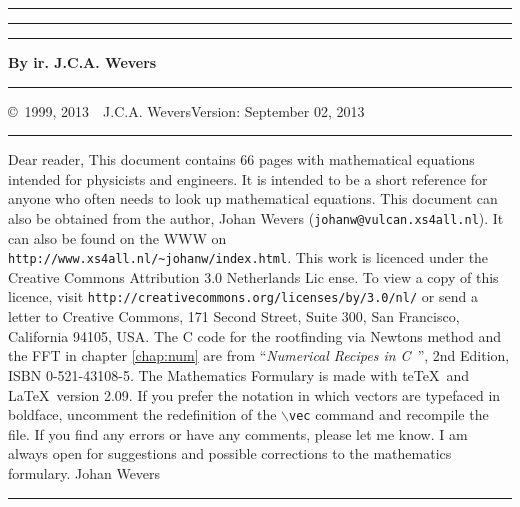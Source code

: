 \pagestyle{fancyplain}
\cfoot{\fancyplain{\thepage}{}}

\thispagestyle{empty}
\hrule
\rule{.4pt}{22.35cm}\hspace*{161.62mm}\rule{.4pt}{22.35cm}
\vspace*{-17cm}
\begin{center}
\Huge
{}
\end{center}
\vspace{2cm}
\centerline{\Large\bf By ir. J.C.A. Wevers}
\vfill
\hrule
\newpage
\thispagestyle{empty}
\copyright~1999, 2013~~J.C.A. Wevers\hfill Version: September 02, 2013
\npar
\hrule
\par
\bigskip
Dear reader,
\npar
This document contains 66 pages with mathematical equations intended for
physicists and engineers. It is intended to be a short reference for anyone
who often needs to look up mathematical equations.
\npar
This document can also be obtained from the author, Johan Wevers ({\tt johanw@vulcan.xs4all.nl}).
\npar
It can also be found on the WWW on {\tt http://www.xs4all.nl/\~{}johanw/index.html}.
\npar
This work is licenced under the Creative Commons Attribution 3.0 Netherlands Lic
ense.
To view a copy of this licence, visit {\tt http://creativecommons.org/licenses/by/3.0/nl/} or send a letter to Creative Commons, 171 Second Street, Suite 300, San Francisco, California 94105, USA.
\npar
The C code for the rootfinding via Newtons method and the FFT in chapter
\ref{chap:num} are from ``{\it Numerical Recipes in C}~'', 2nd Edition,
ISBN 0-521-43108-5.
\npar
The Mathematics Formulary is made with te\TeX\ and \LaTeX\ version 2.09.
\npar
If you prefer the notation in which vectors are typefaced in boldface, uncomment
the redefinition of the {\tt $\backslash$vec} command and recompile the file.
\npar
If you find any errors or have any comments, please let me know. I am always
open for suggestions and possible corrections to the mathematics formulary.
\npar
Johan Wevers
\vfill
\hrule

\newpage

\tableofcontents
\cleardoublepage


\renewcommand{\chaptermark}[1]{\markboth{#1}{#1}}

